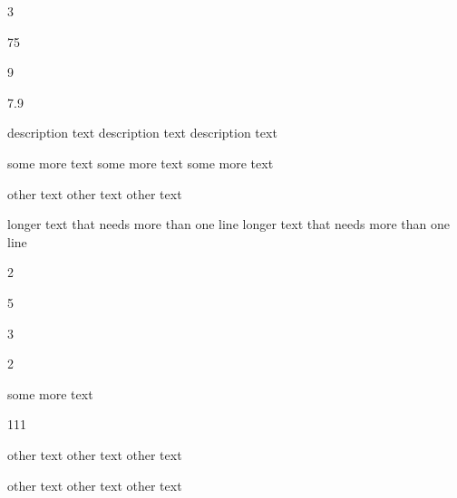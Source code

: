\documentclass{article}
\newenvironment{myreq}[1]{%
\setlist[description]{font=\normalfont\color{darkgray}}%
\begin{tcolorbox}[colframe=black,colback=white, sharp corners, boxrule=1pt]%
\bfseries\color{blue}%
\begin{description}#1}%
{\end{description}\end{tcolorbox}}
\newcommand{\threeinline}[3]{\begin{multicols}{3}#1 #2 #3\end{multicols}}
\newcommand{\twoinline}[2]{\begin{multicols}{2}#1 #2\end{multicols}}
\newcommand{\reqno}{\item[Requirement \#:]}
\newcommand{\reqtype}{\item[Requirement Type:]}
\newcommand{\reqevent}{\item[Event/BUC/PUC \#:]}
\newcommand{\reqdesc}{\item[Description:]}
\newcommand{\reqrat}{\item[Rationale:]}
\newcommand{\reqorig}{\item[Originator:]}
\newcommand{\reqfit}{\item[Fit Criterion:]}
\newcommand{\reqsatis}{\item[Customer Satisfaction:]}
\newcommand{\reqdissat}{\item[Customer Dissatisfaction:]}
\newcommand{\reqdep}{\item[Dependencies:]}
\newcommand{\reqconf}{\item[Conflicts:]}
\newcommand{\reqmater}{\item[Materials:]}
\newcommand{\reqhist}{\item[History:]}
\begin{document}
\begin{myreq}
  \threeinline
  {\reqno 75}
  {\reqtype 9}
  {\reqevent 7.9}
  \reqdesc description text description text description text
  \reqrat some more text some more text some more text
  \reqorig other text other text other text
  \reqfit longer text that needs more than one line longer text that needs more than one line
  \twoinline
  {\reqsatis 5}
  {\reqdissat 3}
  \twoinline
  {\reqdep some more text}
  {\reqconf 111}
  \reqmater other text other text other text
  \reqhist other text other text other text
\end{myreq}
\end{document}
